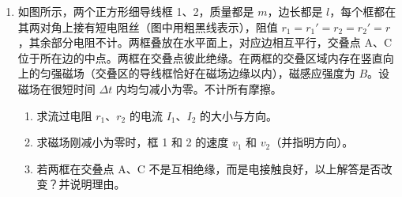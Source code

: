 \documentclass[\gkver]{gaokaozhenti}
\begin{document}
\begin{enumerate}
\item
如图所示，两个正方形细导线框 1、2，质量都是 $m$，边长都是 $l$，每个框都在其两对角上接有短电阻丝（图中用粗黑线表示），阻值 $r_{1} = r_{1}' = r_{2} = r_{2}' = r$，其余部分电阻不计。两框叠放在水平面上，对应边相互平行，交叠点 A、C 位于所在边的中点。两框在交叠点彼此绝缘。在两框的交叠区域内存在竖直向上的匀强磁场（交叠区的导线框恰好在磁场边缘以内），磁感应强度为 $B$。设磁场在很短时间 $\Delta t$ 内均匀减小为零。不计所有摩擦。
\begin{enumerate}
	\item
	求流过电阻 $r_{1}$、$r_{2}$ 的电流 $I_{1}$、$I_{2}$ 的大小与方向。
	\item
	求磁场刚减小为零时，框 1 和 2 的速度 $v_{1}$ 和 $v_{2}$（并指明方向）。
	\item
	若两框在交叠点 A、C 不是互相绝缘，而是电接触良好，以上解答是否改变？并说明理由。
\end{enumerate}
\onepicture[align=right, w=6cm]{}
\end{enumerate}
\end{document}
